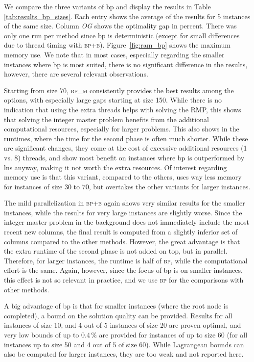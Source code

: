\documentclass[]{amsart}
\newcommand{\bpplain}{\textsc{bp}\xspace}
\newcommand{\bpmulti}{\textsc{bp\_m}\xspace}
\newcommand{\bpbg}{\textsc{bp+b}\xspace}
\theoremstyle{plain}
\begin{document}
We compare the three variants of \gls{bp} and display the results in Table \ref{tab:results_bp_sizes}. Each entry shows the average of the results for 5 instances of the same size. Column \emph{OG} shows the optimality gap in percent. There was only one run per method since \gls{bp} is deterministic (except for small differences due to thread timing with \bpbg). Figure~\ref{fig:ram_bp} shows the maximum memory use. We note that in most cases, especially regarding the smaller instances where \gls{bp} is most suited, there is no significant difference in the results, however, there are several relevant observations. 

Starting from size 70, \bpmulti consistently provides the best results among the options, with especially large gaps starting at size 150. While there is no indication that using the extra threads helps with solving the RMP, this shows that solving the integer master problem benefits from the additional computational resources, especially for larger problems. This also shows in the runtimes, where the time for the second phase is often much shorter. While these are significant changes, they come at the cost of excessive additional resources (1 vs. 8) threads, and show most benefit on instances where \gls{bp} is outperformed by \gls{lns} anyway, making it not worth the extra resources. Of interest regarding memory use is that this variant, compared to the others, uses way less memory for instances of size 30 to 70, but overtakes the other variants for larger instances.

The mild parallelization in \bpbg again shows very similar results for the smaller instances, while the results for very large instances are slightly worse. Since the integer master problem in the background does not immediately include the most recent new columns, the final result is computed from a slightly inferior set of columns compared to the other methods. However, the great advantage is that the extra runtime of the second phase is not added on top, but in parallel. Therefore, for larger instances, the runtime is half of \bpplain, while the computational effort is the same. Again, however, since the focus of \gls{bp} is on smaller instances, this effect is not so relevant in practice, and we use \bpplain for the comparisons with other methods.

A big advantage of \gls{bp} is that for smaller instances (where the root node is completed), a bound on the solution quality can be provided. Results for all instances of size 10, and 4 out of 5 instances of size 20 are proven optimal, and very low bounds of up to $0.4\,\%$ are provided for instances of up to size 60 (for all instances up to size 50 and 4 out of 5 of size 60). While Lagrangean bounds can also be computed for larger instances, they are too weak and not reported here.
\end{document}

